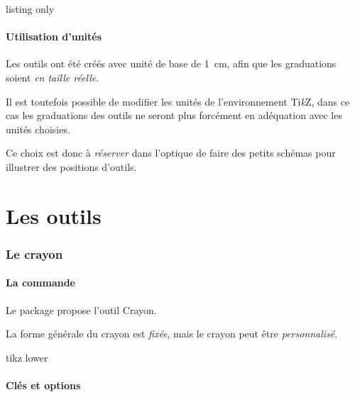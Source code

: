 \documentclass[french,a4paper,11pt]{article}
\providecommand\tikzlogo{Ti\textit{k}Z}
\let\TikZ\tikzlogo
\begin{document}
\begin{PresentationCode}{listing only}
\tkzRegle[clés]
\tkzEquerre[clés]
\tkzRapporteur[clés]
\tkzRequerre[clés]
\tkzRappEquerre[clés]
\tkzRegleRepere[clés]
\tkzCrayon[clés]
\end{PresentationCode}

\subsection{Utilisation d'unités}

\begin{tipblock}
Les outils ont été créés avec unité de base de 1~cm, afin que les graduations soient \textit{en taille réelle}.

\smallskip

Il est toutefois possible de modifier les unités de l'environnement \TikZ, dans ce cas les graduations des outils ne seront plus forcément en adéquation avec les unités choisies.

\smallskip

Ce choix est donc à \textit{réserver} dans l'optique de faire des petits schémas pour illustrer des positions d'outils.
\end{tipblock}

\pagebreak

\part{Les outils}

\section{Le crayon}

\subsection{La commande}

\begin{cautionblock}
Le package propose l'outil \textsf{Crayon}.

La forme générale du crayon est \textit{fixée}, mais le crayon peut être \textit{personnalisé}.
\end{cautionblock}

\begin{PresentationCode}{tikz lower}
\tkzCrayon
\end{PresentationCode}

\subsection{Clés et options}
\end{document}
